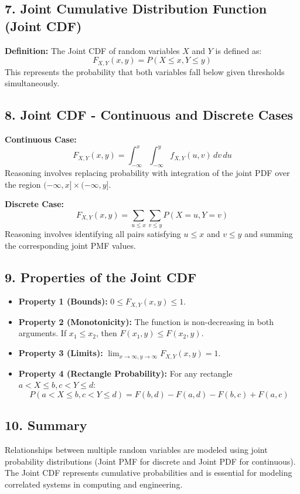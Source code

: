 \documentclass{article}
\begin{document}
\subsection*{7. Joint Cumulative Distribution Function (Joint CDF)}
\textbf{Definition:} The Joint CDF of random variables $X$ and $Y$ is defined as:
\[ F_{X,Y}(x,y) = P(X \le x, Y \le y) \]
This represents the probability that both variables fall below given thresholds simultaneously.

\subsection*{8. Joint CDF - Continuous and Discrete Cases}
\textbf{Continuous Case:}
\[ F_{X,Y}(x,y) = \int_{-\infty}^{x} \int_{-\infty}^{y} f_{X,Y}(u,v) \, dv \, du \]
Reasoning involves replacing probability with integration of the joint PDF over the region $(-\infty, x] \times (-\infty, y]$.

\textbf{Discrete Case:}
\[ F_{X,Y}(x,y) = \sum_{u \le x} \sum_{v \le y} P(X=u, Y=v) \]
Reasoning involves identifying all pairs satisfying $u \le x$ and $v \le y$ and summing the corresponding joint PMF values.

\subsection*{9. Properties of the Joint CDF}
\begin{itemize}
    \item \textbf{Property 1 (Bounds):} $0 \le F_{X,Y}(x,y) \le 1$.
    \item \textbf{Property 2 (Monotonicity):} The function is non-decreasing in both arguments. If $x_1 \le x_2$, then $F(x_1, y) \le F(x_2, y)$.
    \item \textbf{Property 3 (Limits):} $\lim_{x \to \infty, y \to \infty} F_{X,Y}(x,y) = 1$.
    \item \textbf{Property 4 (Rectangle Probability):} For any rectangle $a < X \le b, c < Y \le d$:
    \[ P(a < X \le b, c < Y \le d) = F(b,d) - F(a,d) - F(b,c) + F(a,c) \]
\end{itemize}

\subsection*{10. Summary}
Relationships between multiple random variables are modeled using joint probability distributions (Joint PMF for discrete and Joint PDF for continuous). The Joint CDF represents cumulative probabilities and is essential for modeling correlated systems in computing and engineering.
\end{document}
